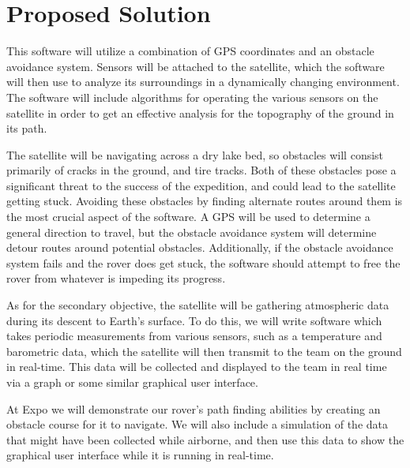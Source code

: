 \documentclass[10pt,onecolumn,draftclsnofoot,journal]{IEEEtran}
\begin{document}
\section*{\textbf{Proposed Solution}}
\noindent This software will utilize a combination of GPS coordinates and an obstacle avoidance system. Sensors will be attached to the satellite, which the software will then use to analyze its surroundings in a dynamically changing environment. The software will include algorithms for operating the various sensors on the satellite in order to get an effective analysis for the topography of the ground in its path.
\par\vspace{3mm} 
\noindent The satellite will be navigating across a dry lake bed, so obstacles will consist primarily of cracks in the ground, and tire tracks. Both of these obstacles pose a significant threat to the success of the expedition, and could lead to the satellite getting stuck. Avoiding these obstacles by finding alternate routes around them is the most crucial aspect of the software. A GPS will be used to determine a general direction to travel, but the obstacle avoidance system will determine detour routes around potential obstacles. Additionally, if the obstacle avoidance system fails and the rover does get stuck, the software should attempt to free the rover from whatever is impeding its progress. 
\par\vspace{3mm}
\noindent As for the secondary objective, the satellite will be gathering atmospheric data during its descent to Earth’s surface. To do this, we will write software which takes periodic measurements from various sensors, such as a temperature and barometric data, which the satellite will then transmit to the team on the ground in real-time. This data will be collected and displayed to the team in real time via a graph or some similar graphical user interface. 
\par\vspace{3mm}
\noindent At Expo we will demonstrate our rover's path finding abilities by creating an obstacle course for it to navigate. We will also include a simulation of the data that might have been collected while airborne, and then use this data to show the graphical user interface while it is running in real-time.
\end{document}
